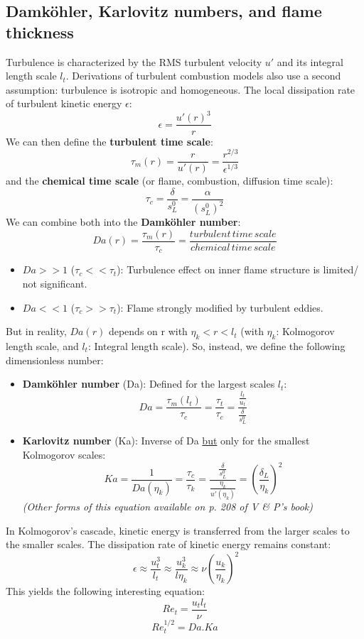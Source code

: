 \documentclass[a4paper,11pt]{article}
\begin{document}
\subsection{Damköhler, Karlovitz numbers, and flame thickness}
	Turbulence is characterized by the RMS turbulent velocity $u'$ and its integral length scale $l_t$. Derivations of turbulent combustion models also use a second assumption: turbulence is isotropic and homogeneous. The local dissipation rate of turbulent kinetic energy $\epsilon$:
	\[\epsilon = \frac{u'(r)^3}{r}\]
	We can then define the \textbf{turbulent time scale}: 
	\[\tau_m(r) = \frac{r}{u'(r)} = \frac{r^{2/3}}{\epsilon^{1/3}}\] 
	and the \textbf{chemical time scale} (or flame, combustion, diffusion time scale):
	\[\tau_c = \frac{\delta}{{s^0_L}} =  \frac{\alpha}{(s^0_L)^2} \]
	We can combine both into the \textbf{Damköhler number}:
	\[Da(r) = \frac{\tau_m(r)}{\tau_c}= \frac{turbulent\,time\,scale}{chemical\,time\,scale}\]
	\begin{itemize}
		\item $Da>>1$ ($\tau_c<<\tau_t$): Turbulence effect on inner flame structure is limited/ not significant.
		\item $Da<<1$ ($\tau_c>>\tau_t$): Flame strongly modified by turbulent eddies.
	\end{itemize}
But in reality, $Da(r)$ depends on r with $\eta_k < r < l_t$ (with $\eta_k$: Kolmogorov length scale, and $l_t$: Integral length scale). So, instead, we define the following dimensionless number:
\begin{itemize}
	\item \textbf{Damköhler number} (Da): Defined for the largest scales $l_t$:
	\[Da = \frac{\tau_m(l_t)}{\tau_c}=\frac{\tau_t}{\tau_c} = \frac{\frac{l_t}{u_t}}{\frac{\delta}{s^0_L}}\]
	\item \textbf{Karlovitz number} (Ka): Inverse of Da \underline{but} only for the smallest Kolmogorov scales:
	\[Ka = \frac{1}{Da(\eta_k)} = \frac{\tau_c}{\tau_k} = \frac{\frac{\delta}{s^0_L}}{\frac{\eta_k}{u'(\eta_k)}} = (\frac{\delta_L}{\eta_k})^2\]
	\textit{(Other forms of this equation available on p. 208 of V \& P's book)}
\end{itemize}
In Kolmogorov's cascade, kinetic energy is transferred from the larger scales to the smaller scales. The dissipation rate of kinetic energy remains constant:
\[\ \epsilon \approx \frac{u_t^3}{l_t} \approx \frac{u_k^3}{l\eta_k} \approx \nu(\frac{u_k}{\eta_k})^2\]
This yields the following interesting equation:
\[ Re_t = \frac{u_t l_t}{\nu} \]
\[ Re_t^{1/2} = Da.Ka \]
\end{document}
